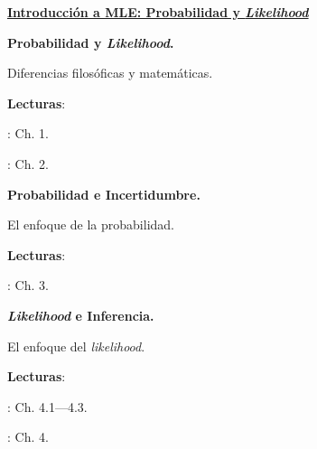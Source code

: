 \documentclass[letterpaper]{article}
\renewenvironment{itemize}{
  \begin{list}{}{
    \setlength{\leftmargin}{1.5em}
  }
}{
  \end{list}
}
\begin{document}
\begin{enumerate}[label=\roman*.]
	\item {\bf {\color{ForestGreen}\underline{Introducci\'on a MLE: Probabilidad y \emph{Likelihood}}}}


      \begin{itemize} 
        \item[7.] {\bf Probabilidad y \emph{Likelihood}.}
        \begin{itemize} 
          \item[$\circ$] Diferencias filos\'oficas y matem\'aticas.
          \item[$\circ$] {\bf Lecturas}: 
            \begin{itemize} 
              \item[$\diamond$] \textcite{Ward2018}: Ch. 1.
              \item[$\diamond$] \textcite{King1998}: Ch. 2.
            \end{itemize}
        \end{itemize}
      \end{itemize}


      \begin{itemize} 
        \item[8.] {\bf Probabilidad e Incertidumbre.}
        \begin{itemize} 
          \item[$\circ$] El enfoque de la probabilidad.
          \item[$\circ$] {\bf Lecturas}: 
            \begin{itemize} 
              \item[$\diamond$] \textcite{King1998}: Ch. 3.
            \end{itemize}
        \end{itemize}
      \end{itemize}


      \begin{itemize} 
        \item[9.] {\bf \emph{Likelihood} e Inferencia.}
        \begin{itemize} 
          \item[$\circ$] El enfoque del \emph{likelihood}.
          \item[$\circ$] {\bf Lecturas}: 
            \begin{itemize} 
              \item[$\diamond$] \textcite{King1998}: Ch. 4.1---4.3. 
              \item[$\diamond$] \textcite{Ward2018}: Ch. 4.
            \end{itemize}
        \end{itemize}
      \end{itemize}



\end{enumerate}
\end{document}
